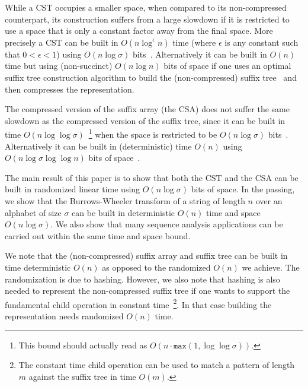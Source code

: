 \documentclass[a4paper]{article}
\begin{document}
While a \textsc{CST} occupies a smaller space, when compared to its non-compressed counterpart, its construction suffers from a large slowdown if it is restricted to use a space that is only a constant factor away from the final space. More precisely a \textsc{CST} can be built in $O(n\log^\epsilon n)$ time (where $\epsilon$ is any constant such that $0<\epsilon<1$) using $O(n\log\sigma)$ bits~\cite{HSS09}. Alternatively it can be built in $O(n)$ time but using (non-succinct) $O(n\log n)$ bits of space if one uses an optimal suffix tree construction algorithm to build the (non-compressed) suffix tree~\cite{Fa97} and then compresses the representation. 




The compressed version of the suffix array (the \textsc{CSA}) does not suffer the same slowdown as the compressed version of the suffix tree, since it can be built in time $O(n\log\log\sigma)$~\footnote{This bound should actually read as $O(n\cdot\mathtt{max}(1,\log\log\sigma))$. } when the space is restricted to be $O(n\log\sigma)$ bits~\cite{HSS09}. 
Alternatively it can be built in (deterministic) time $O(n)$ using $O(n\log\sigma \log\log n)$ bits of space~\cite{OS09}.


The main result of this paper is to show that both the \textsc{CST} and the \textsc{CSA} can be built in randomized linear time using $O(n\log\sigma)$ bits of space. In the passing, we show that the Burrows-Wheeler transform of a string of length $n$ over 
an alphabet of size $\sigma$ can be built in deterministic $O(n)$ time and space $O(n\log\sigma)$. We also 
show that many sequence analysis applications can be carried out within the same time and space bound. 



We note that the (non-compressed) suffix array and suffix tree can be built in time deterministic $O(n)$ as opposed to the randomized $O(n)$ we achieve. The randomization is due to hashing. However, we also note that hashing is also needed to represent the non-compressed suffix tree if one wants to support the fundamental child operation in constant time~\footnote{The constant time child operation can be used to match a pattern of length $m$ against the suffix tree in time $O(m)$.}. In that case building the representation needs randomized $O(n)$ time. 

\begin{comment}
Otherwise, if one insists on deterministic linear time, then the child operation (on a non-compressed suffix tree) can only be supported in $O(\log\log\sigma)$ time.
If one abandons the requirement that certain operations on the compressed suffix tree be supported in constant time (but supported in $O(\log\log\sigma)$ time), then we show that the compressed suffix tree can be built in deterministic $O(n\log\log\sigma)$ time. 
\end{comment}
\end{document}
